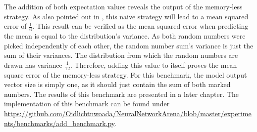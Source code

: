 \documentclass[draft,final]{vutinfth} %
\begin{document}
    The addition of both expectation values reveals the output of the memory-less strategy.
    As also pointed out in \cite[p. 6]{UnitaryRNNs}, this naive strategy will lead to a mean squared error of $\frac{1}{6}$.
    This result can be verified as the mean squared error when predicting the mean is equal to the distribution's variance.
    As both random numbers were picked independently of each other, the random number sum's variance is just the sum of their variances.
    The distribution from which the random numbers are drawn has variance $\frac{1}{12}$.
    Therefore, adding this value to itself proves the mean square error of the memory-less strategy.
    For this benchmark, the model output vector size is simply one, as it should just contain the sum of both marked numbers.
    The results of this benchmark are presented in a later chapter.
    The implementation of this benchmark can be found under \url{https://github.com/Oidlichtnwoada/NeuralNetworkArena/blob/master/experiments/benchmarks/add_benchmark.py}.
\end{document}

